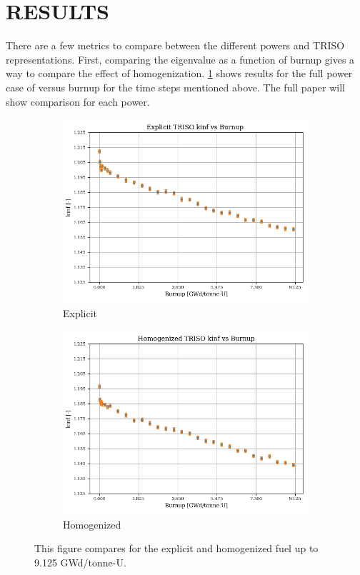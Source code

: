 \documentclass[letterpaper]{physor2024}
\begin{document}
\section{RESULTS}\label{sec:results}
There are a few metrics to compare between the different powers and TRISO representations. First, comparing the eigenvalue as a function of burnup gives a way to compare the effect of homogenization.  \cref{fig:kinf_vs_burnup_100_comp} shows results for the full power case of \kinf versus burnup for the time steps mentioned above. The full paper will show comparison for each power.
\vspace*{-0.25cm}
\begin{figure}[!h]
    \centering
    \begin{subfigure}{0.49\linewidth}
        \centering
        \includegraphics[width=\linewidth]{figures/explicit_kinf_vs_burnup.png}
        \caption{Explicit}
    \end{subfigure}
    \begin{subfigure}{0.49\linewidth}
        \centering
        \includegraphics[width=\linewidth]{figures/homogenized_kinf_vs_burnup.png}
        \caption{Homogenized}
    \end{subfigure}
    \caption{This figure compares \kinf for the explicit and homogenized fuel up to 9.125 GWd/tonne-U.}
    \label{fig:kinf_vs_burnup_100_comp}
\end{figure}
\end{document}
